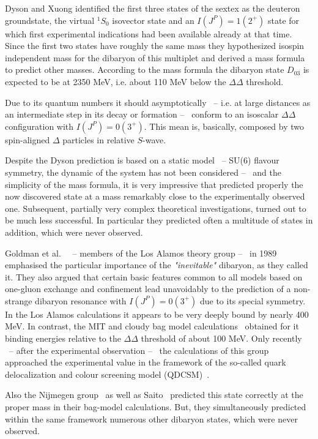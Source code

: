 Dyson and Xuong identified the first three states of the sextex as the deuteron groundstate, the virtual
$^{1}S_{0}$ isovector state and an $I(J^{P}) = 1(2^{+})$ state for which first experimental indications
had been available already at that time.
Since the first two states have roughly the same mass they hypothesized isospin independent mass for the 
dibaryon of this multiplet and derived a mass formula to predict other masses.
According to the mass formula the dibaryon state $D_{03}$ is expected to be at 2350 MeV, 
i.e. about 110 MeV below the $\Delta \Delta$ threshold.

Due to its quantum numbers it should asymptotically \ -- i.e. at large distances as an intermediate
step in its decay or formation -- \ conform to an isoscalar $\Delta \Delta$configuration with
$I(J^{P}) = 0(3^{+})$. This mean is, basically, composed by two spin-aligned $\Delta$ particles
in relative $S$-wave.

Despite the Dyson prediction is based on a static model \ -- SU(6) flavour symmetry, the dynamic
of the system has not been considered -- \ and the simplicity of the mass formula, it is very 
impressive that predicted properly the now discovered state \dst at a mass remarkably close to the
experimentally observed one. 
Subsequent, partially very complex theoretical investigations, turned out to be much less successful.
In particular they predicted often a multitude of states in addition, which were never observed.

Goldman et al.~\cite{dsinevitable1} \ -- members of the Los Alamos theory group -- \ in 1989 emphasised
the particular importance of the \textit{"inevitable"} \ds dibaryon, as they called it.
They also argued that certain basic features common to all models based on one-gluon exchange
and confinement lead unavoidably to the prediction of a non-strange dibaryon resonance \ds 
with $I(J^{P}) = 0(3^{+})$ due to its special symmetry.
In the Los Alamos calculations it appears to be very deeply bound by nearly 400 MeV.
In contrast, the MIT and cloudy bag model calculations~\cite{dibpred2,dibpred5,dibpred6}
obtained for it binding energies relative to the
$\Delta \Delta$ threshold of about 100 MeV.
Only recently \ -- after the experimental observation -- \ the calculations of this group approached
the experimental value in the framework of the so-called quark delocalization and colour screening model
(QDCSM)~\cite{dsqm1}.

Also the Nijmegen group~\cite{dibpred1,dibpred2,dibpred3} as well as Saito~\cite{dibpred6} predicted
this state correctly at the proper mass in their bag-model calculations. But, they simultaneously predicted
within the same framework numerous other dibaryon states, which were never observed.

